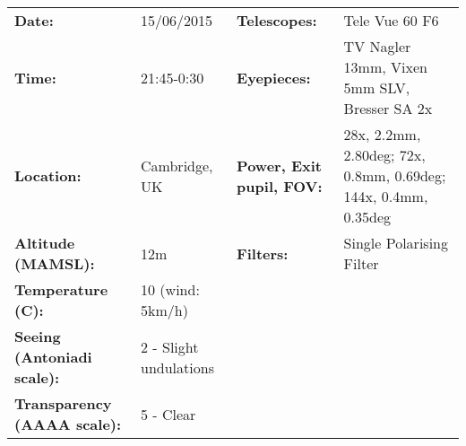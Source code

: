 \begin{tabular}{ p{1.7in} p{1.2in} p{1.5in} p{4.2in}}
{\bf Date:} & 15/06/2015 & {\bf Telescopes:} & Tele Vue 60 F6 \\ 
{\bf Time:} & 21:45-0:30 & {\bf Eyepieces:} & TV Nagler 13mm, Vixen 5mm SLV, Bresser SA 2x \\ 
{\bf Location:} & Cambridge, UK & {\bf Power, Exit pupil, FOV:} & 28x, 2.2mm, 2.80deg; 72x, 0.8mm, 0.69deg; 144x, 0.4mm, 0.35deg \\ 
{\bf Altitude (MAMSL):} & 12m & {\bf Filters:} & Single Polarising Filter \\ 
{\bf Temperature (C):} & 10 (wind: 5km/h) & & \\ 
{\bf Seeing (Antoniadi scale):} & 2 - Slight undulations & & \\ 
{\bf Transparency (AAAA scale):} & 5 - Clear & & \\ 
\end{tabular}
\centering 
